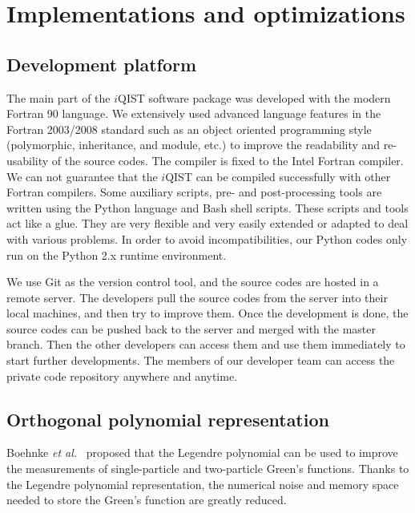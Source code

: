 \section{Implementations and optimizations\label{sec:implement}}
\subsection{Development platform}
The main part of the $i$QIST software package was developed with the modern Fortran 90 language. We extensively used advanced language features in the Fortran 2003/2008 standard such as an object oriented programming style (polymorphic, inheritance, and module, etc.) to improve the readability and re-usability of the source codes. The compiler is fixed to the Intel Fortran compiler. We can not guarantee that the $i$QIST can be compiled successfully with other Fortran compilers. Some auxiliary scripts, pre- and post-processing tools are written using the Python language and Bash shell scripts. These scripts and tools act like a glue. They are very flexible and very easily extended or adapted to deal with various problems. In order to avoid incompatibilities, our Python codes only run on the Python 2.x runtime environment.

We use Git as the version control tool, and the source codes are hosted in a remote server. The developers pull the source codes from the server into their local machines, and then try to improve them. Once the development is done, the source codes can be pushed back to the server and merged with the master branch. Then the other developers can access them and use them immediately to start further developments. The members of our developer team can access the private code repository anywhere and anytime.  

\subsection{Orthogonal polynomial representation}
Boehnke \emph{et al.}~\cite{PhysRevB.84.075145} proposed that the Legendre polynomial can be used to improve the measurements of single-particle and two-particle Green's functions. Thanks to the Legendre polynomial representation, the numerical noise and memory space needed to store the Green's function are greatly reduced.

